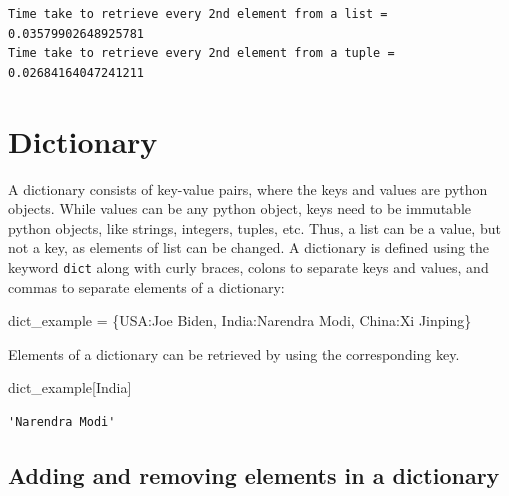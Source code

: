 \documentclass[
  letterpaper,
  DIV=11,
  numbers=noendperiod]{scrreprt}
\newenvironment{Shaded}{\begin{snugshade}}{\end{snugshade}}
\newcommand{\NormalTok}[1]{\textcolor[rgb]{0.00,0.23,0.31}{#1}}
\newcommand{\OperatorTok}[1]{\textcolor[rgb]{0.37,0.37,0.37}{#1}}
\newcommand{\StringTok}[1]{\textcolor[rgb]{0.13,0.47,0.30}{#1}}
\begin{document}
\begin{verbatim}
Time take to retrieve every 2nd element from a list =  0.03579902648925781
Time take to retrieve every 2nd element from a tuple =  0.02684164047241211
\end{verbatim}

\hypertarget{dictionary}{%
\section{Dictionary}\label{dictionary}}

A dictionary consists of key-value pairs, where the keys and values are
python objects. While values can be any python object, keys need to be
immutable python objects, like strings, integers, tuples, etc. Thus, a
list can be a value, but not a key, as elements of list can be changed.
A dictionary is defined using the keyword \texttt{dict} along with curly
braces, colons to separate keys and values, and commas to separate
elements of a dictionary:

\begin{Shaded}
\begin{Highlighting}[]
\NormalTok{dict\_example }\OperatorTok{=}\NormalTok{ \{}\StringTok{\textquotesingle{}USA\textquotesingle{}}\NormalTok{:}\StringTok{\textquotesingle{}Joe Biden\textquotesingle{}}\NormalTok{, }\StringTok{\textquotesingle{}India\textquotesingle{}}\NormalTok{:}\StringTok{\textquotesingle{}Narendra Modi\textquotesingle{}}\NormalTok{, }\StringTok{\textquotesingle{}China\textquotesingle{}}\NormalTok{:}\StringTok{\textquotesingle{}Xi Jinping\textquotesingle{}}\NormalTok{\}}
\end{Highlighting}
\end{Shaded}

Elements of a dictionary can be retrieved by using the corresponding
key.

\begin{Shaded}
\begin{Highlighting}[]
\NormalTok{dict\_example[}\StringTok{\textquotesingle{}India\textquotesingle{}}\NormalTok{]}
\end{Highlighting}
\end{Shaded}

\begin{verbatim}
'Narendra Modi'
\end{verbatim}

\hypertarget{adding-and-removing-elements-in-a-dictionary}{%
\subsection{Adding and removing elements in a
dictionary}\label{adding-and-removing-elements-in-a-dictionary}}
\end{document}
